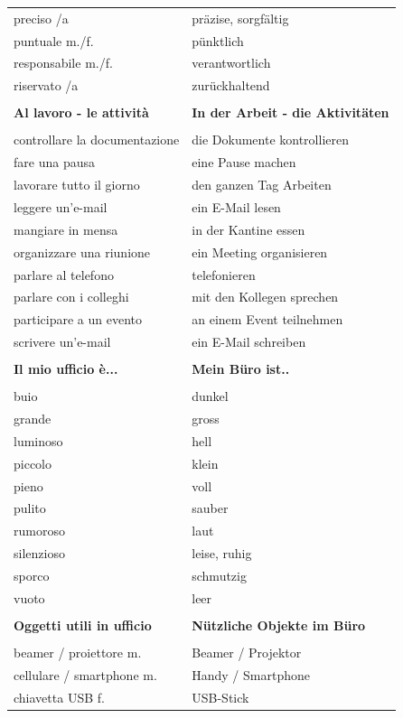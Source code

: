 \documentclass[10pt]{scrartcl}
\begin{document}
\begin{multicols*}{2}
\begin{supertabular}{p{4cm}p{4cm}}
preciso /a & präzise, sorgfältig\\
puntuale \hfill m./f. & pünktlich\\
responsabile \hfill m./f. & verantwortlich\\
riservato /a & zurückhaltend\\
\\
\textbf{Al lavoro - le attività} & \textbf{In der Arbeit - die Aktivitäten}\\
\\
controllare la documentazione & die Dokumente kontrollieren\\
fare una pausa & eine Pause machen\\
lavorare tutto il giorno & den ganzen Tag Arbeiten\\ leggere un'e-mail & ein E-Mail lesen\\
mangiare in mensa & in der Kantine essen\\
organizzare una riunione & ein Meeting organisieren\\
parlare al telefono & telefonieren\\
parlare con i colleghi & mit den Kollegen sprechen\\
participare a un evento & an einem Event teilnehmen\\
scrivere un'e-mail & ein E-Mail schreiben\\
\\
\textbf{Il mio ufficio è...} & \textbf{Mein Büro ist..}\\
\\
buio & dunkel\\
grande & gross\\
luminoso & hell\\
piccolo & klein\\
pieno & voll\\
pulito & sauber\\
rumoroso & laut\\
silenzioso & leise, ruhig\\
sporco & schmutzig\\
vuoto & leer\\
\\
\textbf{Oggetti utili in ufficio} &  \textbf{Nützliche Objekte im Büro}\\
\\
beamer / proiettore \hfill m. & Beamer / Projektor\\
cellulare / smartphone \hfill m. & Handy / Smartphone\\
chiavetta USB \hfill f. & USB-Stick\\

\end{supertabular}
\end{multicols*}
\end{document}
